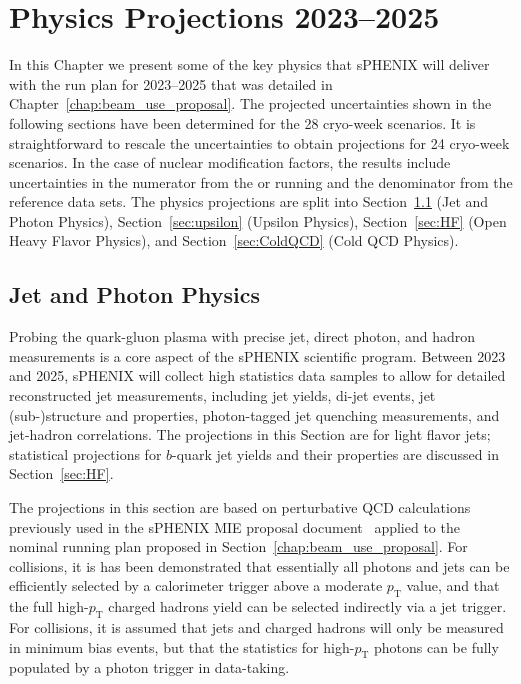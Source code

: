 \chapter{Physics Projections 2023--2025}
\label{chap:physics_projections}

In this Chapter we present some of the key physics that sPHENIX will
deliver with the run plan for 2023--2025 that was detailed in
Chapter~\ref{chap:beam_use_proposal}.  The projected uncertainties
shown in the following sections have been determined for the 28
cryo-week scenarios. It is straightforward to rescale the
uncertainties to obtain projections for 24 cryo-week scenarios.  In
the case of nuclear modification factors, the results include
uncertainties in the numerator from the \auau or \pau running and the
denominator from the \pp reference data sets.  The physics projections
are split into Section~\ref{sec:jet} (Jet and Photon Physics),
Section~\ref{sec:upsilon} (Upsilon Physics), Section~\ref{sec:HF}
(Open Heavy Flavor Physics), and Section~\ref{sec:ColdQCD} (Cold QCD
Physics).

\section{Jet and Photon Physics}
\label{sec:jet}

Probing the quark-gluon plasma with precise jet, direct photon, and
hadron measurements is a core aspect of the sPHENIX scientific
program. Between 2023 and 2025, sPHENIX will collect high statistics
data samples to allow for detailed reconstructed jet measurements,
including jet yields, di-jet events, jet (sub-)structure and
properties, photon-tagged jet quenching measurements, and jet-hadron
correlations.  The projections in this Section are for light flavor
jets; statistical projections for $b$-quark jet yields and their
properties are discussed in Section~\ref{sec:HF}.

The projections in this section are based on perturbative QCD
calculations previously used in the sPHENIX MIE proposal
document~\cite{Adare:2015kwa} applied to the nominal running plan
proposed in Section~\ref{chap:beam_use_proposal}.  For \pp collisions, it
is has been demonstrated that essentially all photons and jets can be efficiently selected by a
calorimeter trigger above a moderate $p_\mathrm{T}$ value, and that
the full high-$p_\mathrm{T}$ charged hadrons yield can be selected
indirectly via a jet trigger. For \auau collisions, it is assumed that
jets and charged hadrons will only be measured in minimum bias events,
but that the statistics for high-$p_\mathrm{T}$ photons can be fully
populated by a photon trigger in \auau data-taking.

